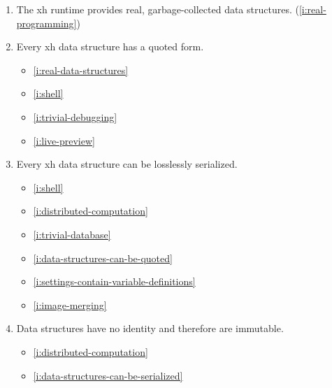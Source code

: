 \documentclass{report}
\makeatletter
\newcommand*{\Label}[2]{%
  \@bsphack
  \begingroup
    \label{#1-original}%
    \def\@currentlabel{#2 [\ref{#1-original}]}%
    \label{#1}%
  \endgroup
  \@esphack
}
\makeatother
\begin{document}
\begin{enumerate}
\item{}\Label{i:real-data-structures}{datastruct}
  The xh runtime provides real, garbage-collected data structures.
(\ref{i:real-programming})
\item{}\Label{i:data-structures-can-be-quoted}{quotestruct}
  Every xh data structure has a quoted form.
\begin{itemize}
\item \ref{i:real-data-structures}
\item \ref{i:shell}
\item \ref{i:trivial-debugging}
\item \ref{i:live-preview}
\end{itemize}
\item{}\Label{i:data-structures-can-be-serialized}{printstruct}
  Every xh data structure can be losslessly serialized.
\begin{itemize}
\item \ref{i:shell}
\item \ref{i:distributed-computation}
\item \ref{i:trivial-database}
\item \ref{i:data-structures-can-be-quoted}
\item \ref{i:settings-contain-variable-definitions}
\item \ref{i:image-merging}
\end{itemize}
\item{}\Label{i:data-structures-are-immutable}{immutable}
  Data structures have no identity and therefore are immutable.
\begin{itemize}
\item \ref{i:distributed-computation}
\item \ref{i:data-structures-can-be-serialized}
\end{itemize}


\end{enumerate}
\end{document}
